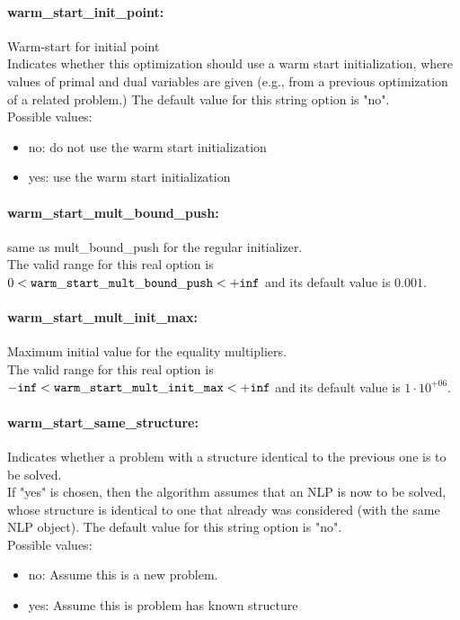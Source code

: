 \paragraph{warm\_start\_init\_point:}\label{sec:warm_start_init_point} Warm-start for initial point $\;$ \\
 Indicates whether this optimization should use a
warm start initialization, where values of primal
and dual variables are given (e.g., from a
previous optimization of a related problem.)
The default value for this string option is "no".
\\ 
Possible values:
\begin{itemize}
   \item no: do not use the warm start initialization
   \item yes: use the warm start initialization
\end{itemize}

\paragraph{warm\_start\_mult\_bound\_push:}\label{sec:warm_start_mult_bound_push} same as mult\_bound\_push for the regular initializer. $\;$ \\
 The valid range for this real option is 
$0 <  {\tt warm\_start\_mult\_bound\_push } <  {\tt +inf}$
and its default value is $0.001$.


\paragraph{warm\_start\_mult\_init\_max:}\label{sec:warm_start_mult_init_max} Maximum initial value for the equality multipliers. $\;$ \\
 The valid range for this real option is 
${\tt -inf} <  {\tt warm\_start\_mult\_init\_max } <  {\tt +inf}$
and its default value is $1 \cdot 10^{+06}$.


\paragraph{warm\_start\_same\_structure:}\label{sec:warm_start_same_structure} Indicates whether a problem with a structure identical to the previous one is to be solved. $\;$ \\
 If "yes" is chosen, then the algorithm assumes
that an NLP is now to be solved, whose structure
is identical to one that already was considered
(with the same NLP object).
The default value for this string option is "no".
\\ 
Possible values:
\begin{itemize}
   \item no: Assume this is a new problem.
   \item yes: Assume this is problem has known structure
\end{itemize}


